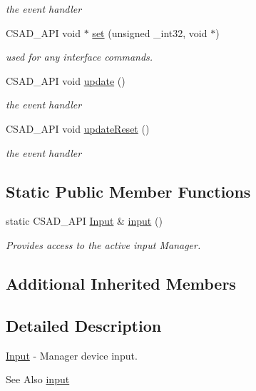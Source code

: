 \begin{DoxyCompactItemize}
\begin{DoxyCompactList}\small\item\em the event handler \end{DoxyCompactList}\item 
\hypertarget{classcsad_1_1_input_ae88db6f7b3d9498032f34a3a5f1f121c}{C\-S\-A\-D\-\_\-\-A\-P\-I void $\ast$ \hyperlink{classcsad_1_1_input_ae88db6f7b3d9498032f34a3a5f1f121c}{set} (unsigned \-\_\-int32, void $\ast$)}\label{classcsad_1_1_input_ae88db6f7b3d9498032f34a3a5f1f121c}

\begin{DoxyCompactList}\small\item\em used for any interface commands. \end{DoxyCompactList}\item 
\hypertarget{classcsad_1_1_input_a81bc6c33ac661fac050f8e7447921b43}{C\-S\-A\-D\-\_\-\-A\-P\-I void \hyperlink{classcsad_1_1_input_a81bc6c33ac661fac050f8e7447921b43}{update} ()}\label{classcsad_1_1_input_a81bc6c33ac661fac050f8e7447921b43}

\begin{DoxyCompactList}\small\item\em the event handler \end{DoxyCompactList}\item 
\hypertarget{classcsad_1_1_input_a6ac63c7befd7af801d8bdac4a7379639}{C\-S\-A\-D\-\_\-\-A\-P\-I void \hyperlink{classcsad_1_1_input_a6ac63c7befd7af801d8bdac4a7379639}{update\-Reset} ()}\label{classcsad_1_1_input_a6ac63c7befd7af801d8bdac4a7379639}

\begin{DoxyCompactList}\small\item\em the event handler \end{DoxyCompactList}\end{DoxyCompactItemize}
\subsection*{Static Public Member Functions}
\begin{DoxyCompactItemize}
\item 
\hypertarget{classcsad_1_1_input_a2e64e6fdc610c1e20ff299ae73b965a3}{static C\-S\-A\-D\-\_\-\-A\-P\-I \hyperlink{classcsad_1_1_input}{Input} \& \hyperlink{classcsad_1_1_input_a2e64e6fdc610c1e20ff299ae73b965a3}{input} ()}\label{classcsad_1_1_input_a2e64e6fdc610c1e20ff299ae73b965a3}

\begin{DoxyCompactList}\small\item\em Provides access to the active input Manager. \end{DoxyCompactList}\end{DoxyCompactItemize}
\subsection*{Additional Inherited Members}


\subsection{Detailed Description}
\hyperlink{classcsad_1_1_input}{Input} -\/ Manager device input. 

\begin{DoxySeeAlso}{See Also}
\hyperlink{classcsad_1_1_input_a2e64e6fdc610c1e20ff299ae73b965a3}{input} 
\end{DoxySeeAlso}
